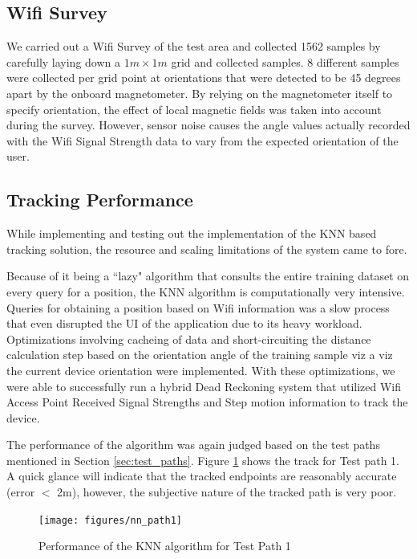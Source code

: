 \subsection{Wifi Survey}

We carried out a Wifi Survey of the test area and collected 1562 samples by 
carefully laying down a $1 m \times 1 m$ grid and collected samples. 8
different samples were collected per grid point at orientations that were
detected to be 45 degrees apart by the onboard magnetometer. By relying on
the magnetometer itself to specify orientation, the effect of local magnetic
fields was taken into account during the survey. However, sensor noise causes
the angle values actually recorded with the Wifi Signal Strength data to vary 
from the expected orientation of the user.

\subsection{Tracking Performance}

While implementing and testing out the implementation of the KNN based 
tracking solution, the resource and scaling limitations of the system 
came to fore. 

Because of it being a ``lazy" algorithm that consults the entire 
training dataset on every query for a position, the KNN algorithm
is computationally very intensive. Queries for obtaining a position based
on Wifi information was a slow process that even disrupted the UI of the 
application due to its heavy workload. Optimizations involving cacheing 
of data and short-circuiting the distance calculation step based on the 
orientation angle of the training sample viz a viz the current device 
orientation were implemented. With these optimizations, we were able 
to successfully run a hybrid Dead Reckoning system that utilized 
Wifi Access Point Received Signal Strengths and Step motion information
to track the device.

The performance of the algorithm was again judged based on the test paths 
mentioned in Section \ref{sec:test_paths}. Figure \ref{fig:nn_path1} shows
the track for Test path 1. A quick glance will indicate that the 
tracked endpoints are reasonably accurate (error $<$ 2m), however, 
the subjective nature of the tracked path is very poor.

\begin{figure}
    \centering
    \texttt{[image: figures/nn\_path1]}
    \caption{Performance of the KNN algorithm for Test Path 1\label{fig:nn_path1}}
\end{figure}

